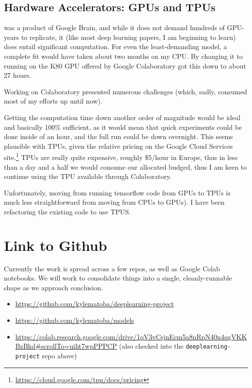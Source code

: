 \documentclass[10pt,twocolumn,letterpaper]{article}
\begin{document}
\subsection{Hardware Accelerators: GPUs and TPUs}
\cite{Cubuk2018} was a product of Google Brain, and while it does not demand hundreds of GPU-years to replicate, it (like most deep learning papers, I am beginning to learn) does entail significant computation. For even the least-demanding model, a complete fit would have taken about two months on my CPU. By changing it to running on the K80 GPU offered by Google Colaboratory got this down to about 27 hours. 

Working on Colaboratory presented numerous challenges (which, sadly, consumed most of my efforts up until now). 

Getting the computation time down another order of magnitude would be ideal and basically 100\% sufficient, as it would mean that quick experiments could be done inside of an hour, and the full run could be down overnight. This seems plausible with TPUs, given the relative pricing on the Google Cloud Services site.\footnote{\url{https://cloud.google.com/tpu/docs/pricing}} TPUs are really quite expensive, roughly \$5/hour in Europe, thus in less than a day and a half we would consume our allocated budged, thus I am keen to continue using the TPU available through Colaboratory. 

Unfortunately, moving from running tensorflow code from GPUs to TPUs is much less straightforward from moving from CPUs to GPUs). I have been refactoring the existing code to use TPUS. 


\section{Link to Github}
Currently the work is spread across a few repos, as well as Google Colab notebooks. We will work to consolidate things into a single, cleanly-runnable shape as we approach conclusion.

\begin{itemize}
\item \url{https://github.com/kylematoba/deeplearning-project}
\item \url{https://github.com/kylematoba/models}
\item \url{https://colab.research.google.com/drive/1qV3vCsjnEcm5a8nRpN40n4qgVKKBzBkd#scrollTo=uiht7wpPPPCP} (also checked into the \texttt{deeplearning-project} repo above)
\end{itemize}


\nocite{Torralba2008}
{\small


}
\end{document}
